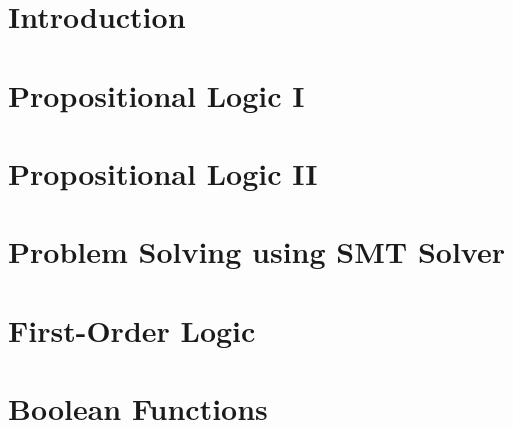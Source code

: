 \documentclass[12pt,openany]{book}
\begin{document}
	
	
	\tableofcontents
	\newpage
	
	\newpage
	\chapter{Introduction}
	
	
	\newpage
%	
	
	\newpage
	\chapter{Propositional Logic I}
	
	
	\newpage
	\chapter{Propositional Logic II}
	
	
	\newpage
	\chapter{Problem Solving using SMT Solver}
	
	
	\newpage
	\chapter{First-Order Logic}
	
	
	
%	
	
%	
	
%	
	
	\newpage
	\appendix
	\chapter{Boolean Functions}
	
	
	
	
	
\end{document}
